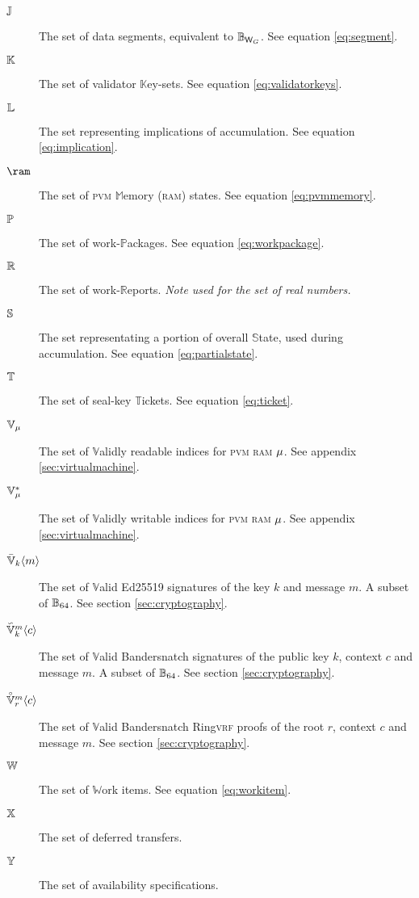 \begin{description}
  \item[$\segment$] The set of data segments, equivalent to $\blob[\Csegmentsize]$. See equation \ref{eq:segment}.
  \item[$\valkey$] The set of validator $\mathbb{K}$ey-sets. See equation \ref{eq:validatorkeys}.
  \item[$\implications$] The set representing implications of accumulation. See equation \ref{eq:implication}.
  \item[$\ram$] The set of \textsc{pvm} $\mathbb{M}$emory (\textsc{ram}) states. See equation \ref{eq:pvmmemory}.
  \item[$\workpackage$] The set of work-$\mathbb{P}$ackages. See equation \ref{eq:workpackage}.
  \item[$\workreport$] The set of work-$\mathbb{R}$eports. \emph{Note used for the set of real numbers.}
  \item[$\partialstate$] The set representating a portion of overall $\mathbb{S}$tate, used during accumulation. See equation \ref{eq:partialstate}.
  \item[$\safroleticket$] The set of seal-key $\mathbb{T}$ickets. See equation \ref{eq:ticket}.
  \item[$\readable{\memory}$] The set of $\mathbb{V}$alidly readable indices for \textsc{pvm} \textsc{ram} $\memory$. See appendix \ref{sec:virtualmachine}.
  \item[$\writable{\memory}$] The set of $\mathbb{V}$alidly writable indices for \textsc{pvm} \textsc{ram} $\memory$. See appendix \ref{sec:virtualmachine}.
  \item[$\edsignature{k}{m}$] The set of $\mathbb{V}$alid Ed25519 signatures of the key $k$ and message $m$. A subset of $\blob[64]$. See section \ref{sec:cryptography}.
  \item[$\bssignature{k}{c}{m}$] The set of $\mathbb{V}$alid Bandersnatch signatures of the public key $k$, context $c$ and message $m$. A subset of $\blob[64]$. See section \ref{sec:cryptography}.
  \item[$\bsringproof{r}{c}{m}$] The set of $\mathbb{V}$alid Bandersnatch Ring\textsc{vrf} proofs of the root $r$, context $c$ and message $m$. See section \ref{sec:cryptography}.
  \item[$\workitem$] The set of $\mathbb{W}$ork items. See equation \ref{eq:workitem}.
  \item[$\defxfer$] The set of deferred transfers.
  \item[$\avspec$] The set of availability specifications.
\end{description}

